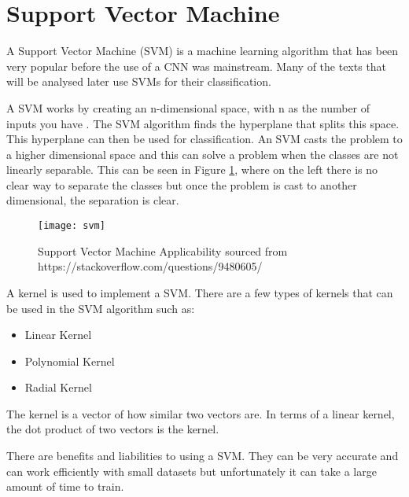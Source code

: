 \section{Support Vector Machine}
A Support Vector Machine (SVM) is a machine learning algorithm that has been
very popular before the use of a CNN was mainstream.
Many of the texts that will be analysed later use SVMs for their classification.

A SVM works by creating an n-dimensional space, with n as the number of
inputs you have \parencite{svm}. The SVM algorithm finds the hyperplane that splits this space.
This hyperplane can then be used for classification. 
An SVM casts the problem to a higher dimensional space and this can solve a problem when the classes are not linearly separable.
This can be seen in Figure \ref{fig:svm}, where on the left there is no clear way to separate the classes but once the problem is cast to another dimensional, the separation is clear.

\begin{figure}[h]
	\centering
    \texttt{[image: svm]}
    \caption[Support Vector Machine Applicability]{Support Vector Machine Applicability sourced from https://stackoverflow.com/questions/9480605/}
    \label{fig:svm}
\end{figure}

A kernel is used to implement a SVM.
There are a few types of kernels that can be used in the SVM algorithm such as:
\begin{itemize}
	\item{Linear Kernel}
	\item{Polynomial Kernel}
	\item{Radial Kernel}
\end{itemize}
The kernel is a vector of how similar two vectors are.
In terms of a linear kernel, the dot product of two vectors is the kernel.

There are benefits and liabilities to using a SVM.
They can be very accurate and can work efficiently with small datasets but unfortunately it can take a large amount of time to train. 